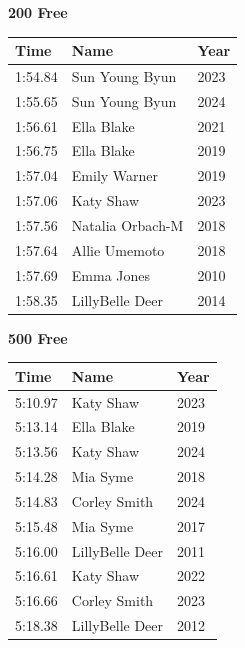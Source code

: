 \vspace{0.3em}
\vspace{1.2em}
\noindent\begin{minipage}[t]{0.48\textwidth}
\centering
\textbf{\textcolor{teamprimary}{200 Free}}\par
\vspace{0.5em}
\centering
\small
\renewcommand{\arraystretch}{1.0}
\setlength{\tabcolsep}{4pt}
\begin{tabular}{@{}p{1.8cm}p{3.0cm}p{1.0cm}@{}}
\toprule
\textbf{Time} & \textbf{Name} & \textbf{Year} \\
\midrule
1:54.84 & Sun Young Byun & 2023 \\
1:55.65 & Sun Young Byun & 2024 \\
1:56.61 & Ella Blake & 2021 \\
1:56.75 & Ella Blake & 2019 \\
1:57.04 & Emily Warner & 2019 \\
1:57.06 & Katy Shaw & 2023 \\
1:57.56 & Natalia Orbach-M & 2018 \\
1:57.64 & Allie Umemoto & 2018 \\
1:57.69 & Emma Jones & 2010 \\
1:58.35 & LillyBelle Deer & 2014 \\
\bottomrule
\end{tabular}
\end{minipage}
\hfill
\begin{minipage}[t]{0.48\textwidth}
\centering
\textbf{\textcolor{teamprimary}{500 Free}}\par
\vspace{0.5em}
\centering
\small
\renewcommand{\arraystretch}{1.0}
\setlength{\tabcolsep}{4pt}
\begin{tabular}{@{}p{1.8cm}p{3.0cm}p{1.0cm}@{}}
\toprule
\textbf{Time} & \textbf{Name} & \textbf{Year} \\
\midrule
5:10.97 & Katy Shaw & 2023 \\
5:13.14 & Ella Blake & 2019 \\
5:13.56 & Katy Shaw & 2024 \\
5:14.28 & Mia Syme & 2018 \\
5:14.83 & Corley Smith & 2024 \\
5:15.48 & Mia Syme & 2017 \\
5:16.00 & LillyBelle Deer & 2011 \\
5:16.61 & Katy Shaw & 2022 \\
5:16.66 & Corley Smith & 2023 \\
5:18.38 & LillyBelle Deer & 2012 \\
\bottomrule
\end{tabular}
\end{minipage}
